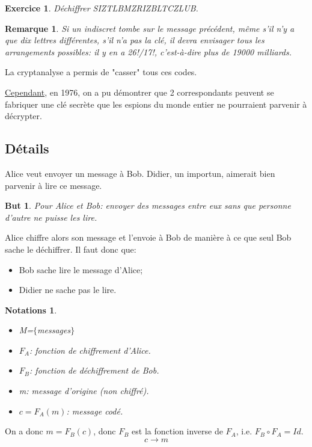 \documentclass[10pt,a4paper]{report}
\newtheorem*{exo}{Exercice}
\newtheorem*{rem}{Remarque}
\newtheorem*{but}{But}
\newtheorem*{notas}{Notations}
\begin{document}
\begin{exo}
Déchiffrer SIZTLBMZRIZBLTCZLUB.
\end{exo}  
  
\begin{rem}
Si un indiscret tombe sur le message précédent, même s'il n'y a que dix lettres différentes, s'il n'a pas la clé, il devra envisager tous les arrangements possibles: il y en a 26!/17!, c'est-à-dire plus de 19000 milliards.
\end{rem}  

La cryptanalyse a permis de "casser" tous ces codes.

\underline{Cependant}, en 1976, on a pu démontrer que 2 correspondants peuvent se fabriquer une clé secrète que les espions du monde entier ne pourraient parvenir à décrypter.

\subsection*{Détails}


Alice veut envoyer un message à Bob. Didier, un importun, aimerait bien parvenir à lire ce message.

\begin{but}
Pour Alice et Bob: envoyer des messages entre eux sans que personne d'autre ne puisse les lire.
\end{but}

Alice chiffre alors son message et l'envoie à Bob de manière à ce que seul Bob sache le déchiffrer. Il faut donc que:
\begin{itemize}
\item[•] Bob sache lire le message d'Alice;
\item[•] Didier ne sache pas le lire.
\end{itemize}

\begin{notas}\
\begin{itemize}
\item[•] M=$\{$messages$\}$
\item[•] $F_A$: fonction de chiffrement d'Alice.
\item[•] $F_B$: fonction de déchiffrement de Bob.
\item[•] m: message d'origine (non chiffré).
\item[•] $c=F_A(m)$: message codé.
\end{itemize}
\end{notas}

On a donc $m=F_B(c)$, donc $F_B$ est la fonction inverse de $F_A$, i.e. $F_B \circ F_A =Id$.
$$      c \longrightarrow m      $$
\end{document}
